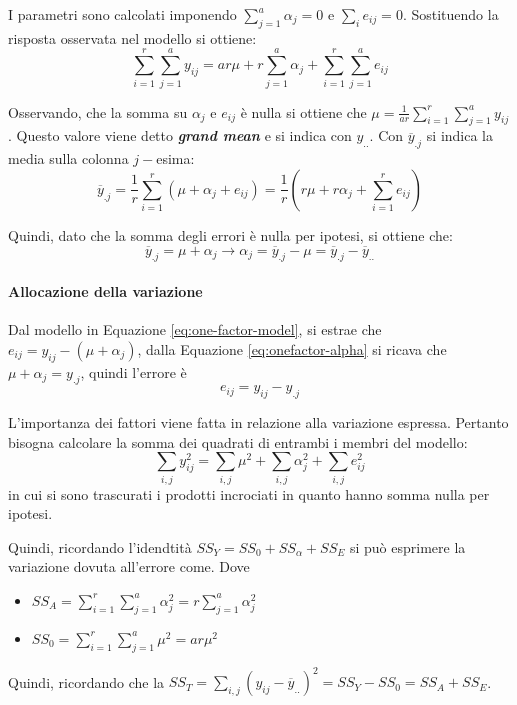 \documentclass{article}
\begin{document}
I parametri sono calcolati imponendo $\sum_{j=1}^a\alpha_j= 0$ e $\sum_ie_{ij} = 0$. 
Sostituendo la risposta osservata nel modello si ottiene:
\[
  \sum_{i=1}^r\sum_{j=1}^a y_{ij} = ar\mu + r \sum_{j=1}^a \alpha_j + \sum_{i=1}^r\sum_{j=1}^a e_{ij}
\]

Osservando, che la somma su $\alpha_j$ e $e_{ij}$ è nulla si ottiene che $\mu = \frac{1}{ar}
\sum_{i=1}^r\sum_{j=1}^a y_{ij}$. Questo valore viene detto \textbf{\textit{grand mean}} e si 
indica con $y_{..}$. Con $\overline{y}_{.j}$ si indica la media sulla colonna $j-$esima:
\[
  \overline{y}_{.j} = \frac{1}{r}\sum_{i=1}^r(\mu + \alpha_j + e_{ij}) = \frac{1}{r}
  \left(r\mu + r\alpha_j + \sum_{i=1}^re_{ij}\right)
\]

Quindi, dato che la somma degli errori è nulla per ipotesi, si ottiene che:
\begin{equation}
  \overline{y}_{.j} = \mu + \alpha_j \to \alpha_j = \overline{y}_{.j} - \mu = 
  \overline{y}_{.j} - \overline{y}_{..}
  \label{eq:onefactor-alpha}
\end{equation}

\paragraph{Allocazione della variazione}
Dal modello in Equazione \ref{eq:one-factor-model}, si estrae che $e_{ij} = y_{ij} - (\mu + 
\alpha_{j})$, dalla Equazione \ref{eq:onefactor-alpha} si ricava che $\mu+\alpha_j = y_{.j}$,
quindi l'errore è
\begin{equation*}
  e_{ij} = y_{ij} - y_{.j}
\end{equation*}

L'importanza dei fattori viene fatta in relazione alla variazione espressa. Pertanto
bisogna calcolare la somma dei quadrati di entrambi i membri del modello:
\[
  \sum_{i,j} y_{ij}^2 = \sum_{i,j}\mu^2 + \sum_{i,j}\alpha_j^2 + \sum_{i,j}e_{ij}^2
\]
in cui si sono trascurati i prodotti incrociati in quanto hanno somma nulla per ipotesi.

Quindi, ricordando l'idendtità $SS_Y = SS_0 + SS_\alpha + SS_E$ si può esprimere 
la variazione dovuta all'errore come. Dove 
\begin{itemize}
  \item $SS_A = \sum_{i=1}^r\sum_{j=1}^a \alpha_j^2 = r\sum_{j=1}^a \alpha_j^2$
  \item $SS_0 = \sum_{i=1}^r\sum_{j=1}^a \mu^2 = ar\mu^2$
\end{itemize}

Quindi, ricordando che la $SS_T = \sum_{i,j}(y_{ij} - \overline{y}_{..})^2 = SS_Y - SS_0 = 
SS_A+SS_E$.
\end{document}
